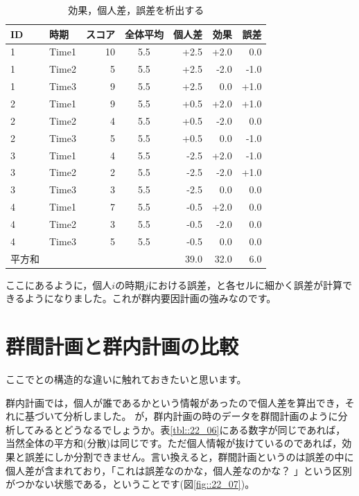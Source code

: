 \documentclass{ltjbook}
\begin{document}
\begin{table}[ht]
  \centering
  \caption{効果，個人差，誤差を析出する} 
  \begin{tabular}{llrcrrr}
    \hline
  ID & 時期 & スコア & 全体平均 & 個人差 & 効果 & 誤差 \\ 
    \hline
  1 & Time1 & 10 & 5.5 & +2.5 & +2.0 & 0.0\\ 
    1 & Time2 & 5 & 5.5 & +2.5 & -2.0 & -1.0\\ 
    1 & Time3 & 9 & 5.5 & +2.5 & 0.0 & +1.0\\ 
    2 & Time1 & 9 & 5.5 & +0.5 & +2.0 & +1.0\\ 
    2 & Time2 & 4 & 5.5 & +0.5 & -2.0 & 0.0\\ 
    2 & Time3 & 5 & 5.5 & +0.5 & 0.0 & -1.0\\ 
    3 & Time1 & 4 & 5.5 & -2.5 & +2.0 & -1.0\\ 
    3 & Time2 & 2 & 5.5 & -2.5 & -2.0 & +1.0\\ 
    3 & Time3 & 3& 5.5 & -2.5 & 0.0 & 0.0 \\ 
    4 & Time1 & 7 & 5.5 & -0.5 & +2.0 & 0.0\\ 
    4 & Time2 & 3 & 5.5 & -0.5 & -2.0 & 0.0\\ 
    4 & Time3 & 5& 5.5  & -0.5 & 0.0 & 0.0 \\ 
     \hline\hline
  平方和&&&&39.0 & 32.0&6.0\\\hline
  \end{tabular}
  \label{tbl::22_07}
  \end{table}

ここにあるように，個人$i$の時期$j$における誤差，と各セルに細かく誤差が計算できるようになりました。これが群内要因計画の強みなのです。

\section{群間計画と群内計画の比較}
ここでとの構造的な違いに触れておきたいと思います。

群内計画では，個人が誰であるかという情報があったので個人差を算出でき，それに基づいて分析しました。
が，群内計画の時のデータを群間計画のように分析してみるとどうなるでしょうか。表\ref{tbl::22_06}にある数字が同じであれば，当然全体の平方和(分散)は同じです。ただ個人情報が抜けているのであれば，効果と誤差にしか分割できません。言い換えると，群間計画というのは誤差の中に個人差が含まれており，「これは誤差なのかな，個人差なのかな？ 」という区別がつかない状態である，ということです(図\ref{fig::22_07})。
\end{document}
